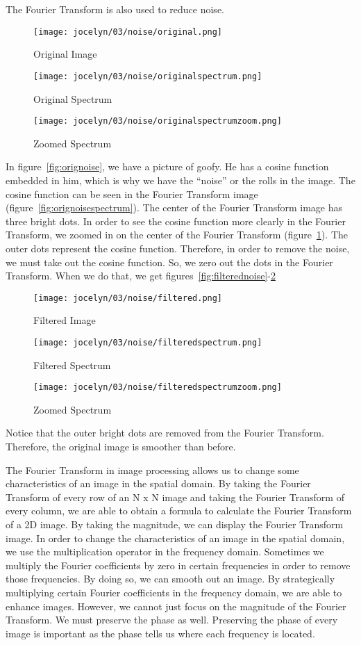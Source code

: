 \documentclass [../article.tex]{subfiles}
\begin{document}
  The Fourier Transform is also used to reduce noise.
  \begin{figure}[!htb]
    \texttt{[image: jocelyn/03/noise/original.png]}
    \caption{Original Image}
    \label{fig:orignoise}
  \endminipage\hfill
    \texttt{[image: jocelyn/03/noise/originalspectrum.png]}
    \caption{Original Spectrum}
    \label{fig:orignoisespectrum}
  \endminipage\hfill
    \texttt{[image: jocelyn/03/noise/originalspectrumzoom.png]}
    \caption{Zoomed Spectrum}
    \label{fig:origzoomed}
  \endminipage
  \end{figure}
  In figure~\ref{fig:orignoise}, we have a picture of goofy. He
  has a cosine function embedded in him, which is why we have the
  ``noise'' or the rolls in the image. The cosine function can
  be seen in the Fourier Transform image
  (figure~\ref{fig:orignoisespectrum}).  The center of
  the Fourier Transform image has three bright dots.  In order to
  see the cosine function more clearly in the Fourier Transform, we
  zoomed in on the center of the Fourier Transform (figure~\ref{fig:origzoomed}).  The outer dots represent the cosine function.
  Therefore, in order to remove the noise, we must take out the
  cosine function.  So, we zero out the dots in the Fourier
  Transform.  When we do that, we get figures~\ref{fig:filterednoise}-\ref{fig:filteredzoom}
  \begin{figure}[!htb]
    \texttt{[image: jocelyn/03/noise/filtered.png]}
    \caption{Filtered Image}
    \label{fig:filterednoise}
  \endminipage\hfill
    \texttt{[image: jocelyn/03/noise/filteredspectrum.png]}
    \caption{Filtered Spectrum}
    \label{fig:filteredspectrum}
  \endminipage\hfill
    \texttt{[image: jocelyn/03/noise/filteredspectrumzoom.png]}
    \caption{Zoomed Spectrum}
    \label{fig:filteredzoom}
  \endminipage
  \end{figure}
  Notice that the outer bright dots are removed from the Fourier
  Transform.  Therefore, the original image is smoother than before.

  The Fourier Transform in image processing allows us to change some
  characteristics of an image in the spatial domain.  By taking the
  Fourier Transform of every row of an N x N image and taking the
  Fourier Transform of every column, we are able to obtain a formula
  to calculate the Fourier Transform of a 2D image.  By taking the
  magnitude, we can display the Fourier Transform image.  In order
  to change the characteristics of an image in the spatial domain,
  we use the multiplication operator in the frequency domain.
  Sometimes we multiply the Fourier coefficients by zero in certain
  frequencies in order to remove those frequencies.  By doing so, we
  can smooth out an image.  By strategically multiplying certain
  Fourier coefficients in the frequency domain, we are able to
  enhance images.  However, we cannot just focus on the magnitude of
  the Fourier Transform.  We must preserve the phase as well.
  Preserving the phase of every image is important as the phase
  tells us where each frequency is located.
\end{document}
